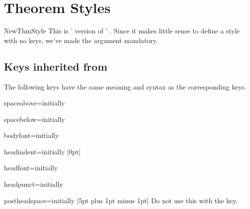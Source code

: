 \documentclass{ltxdoc}
\newcommand{\ttbrackets}[1]{\brackets{\texttt{#1}}}
\begin{document}
\section{Theorem Styles}

\begin{docCommand}{NewThmStyle}{}
This is ' version of ' . Since it makes little sense to define a style with no keys, we've made the  argument mandatory.
\end{docCommand}

\subsection{Keys inherited from }

The following keys have the same meaning and syntax as the corresponding  keys.

\begin{docKey}{spaceabove}{=}{initially }

\end{docKey}

\begin{docKey}{spacebelow}{=}{initially }

\end{docKey}

\begin{docKey}{bodyfont}{=}{initially }

\end{docKey}

\begin{docKey}{headindent}{=}{initially |0pt|}

\end{docKey}

\begin{docKey}{headfont}{=}{initially }

\end{docKey}

\begin{docKey}{headpunct}{=}{initially \ttbrackets{.}}

\end{docKey}

\begin{docKey}{postheadspace}{=}{initially |5pt plus 1pt minus 1pt|}
Do not use this with the  key.
\end{docKey}
\end{document}
